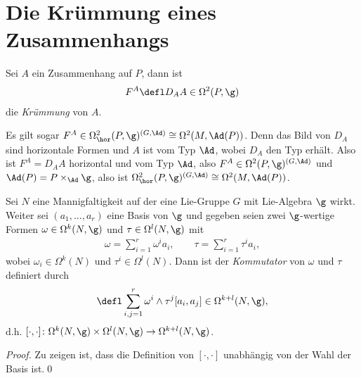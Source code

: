 \documentclass[%
	paper=a5,%
	fleqn,%
	DIV=18,%
	BCOR=0mm,
	fontsize=11pt,
	titlepage=false,%
	bibliography=totoc,
	DIV=18,%
	twoside=true,
	pdftitle=Riemannsche Geometrie,
	pdfauthor=Uwe Semmelmann,
	numbers=noendperiod]%
	{scrbook}
\begin{document}
\section{Die Krümmung eines Zusammenhangs}
\label{sec:Krümmung-eines-Zusammenhangs}

\begin{defn}
Sei $A$ ein Zusammenhang auf $P$, dann ist
\begin{align*}
F^A \defl D_A A \in\Omega^2(P,\g)
\end{align*}
die \emph{Krümmung} von $A$.\fish
\end{defn}

\begin{rem}
Es gilt sogar $F^A \in \Omega_\hor^2(P,\g)^{(G,\Ad)} \cong \Omega^2(M,\Ad(P))$.
Denn das Bild von $D_A$ sind horizontale Formen und $A$ ist vom Typ $\Ad$, wobei
$D_A$ den Typ erhält. Also ist $F^A = D_A A$ horizontal und vom Typ $\Ad$, also
$F^A\in\Omega^2(P,\g)^{(G,\Ad)}$ und $\Ad(P) = P\times_\Ad \g$, also ist
$\Omega_\hor^2(P,\g)^{(G,\Ad)} \cong \Omega^2(M,\Ad(P))$.\map 
\end{rem}

\begin{defn}
Sei $N$ eine Mannigfaltigkeit auf der eine Lie-Gruppe $G$ mit Lie-Algebra $\g$
wirkt. Weiter sei $(a_1,\ldots,a_r)$
eine Basis von $\g$ und gegeben seien zwei $\g$-wertige Formen $\omega\in
\Omega^k(N,\g)$ und $\tau\in\Omega^l(N,\g)$ mit
\begin{align*}
\omega = \sum_{i=1}^r \omega^i a_i,\qquad \tau = \sum_{i=1}^r \tau^i a_i,
\end{align*}
wobei $\omega_i\in\Omega^k(N)$ und $\tau^i\in\Omega^l(N)$. Dann ist der
\emph{Kommutator} von $\omega$ und $\tau$ definiert durch
\begin{align*}
[\omega,\tau]\defl \sum_{i,j=1}^r \omega^i \wedge \tau^j [a_i,a_j]
\in\Omega^{k+l}(N,\g),
\end{align*}
d.h. $[\cdot,\cdot]\colon \Omega^k(N,\g)\times\Omega^l(N,\g) \to
\Omega^{k+l}(N,\g)$.\fish
\end{defn}
\begin{proof}
Zu zeigen ist, dass die Definition von $[\cdot,\cdot]$ unabhängig von der Wahl
der Basis ist.\qed
\end{proof}
\end{document}

